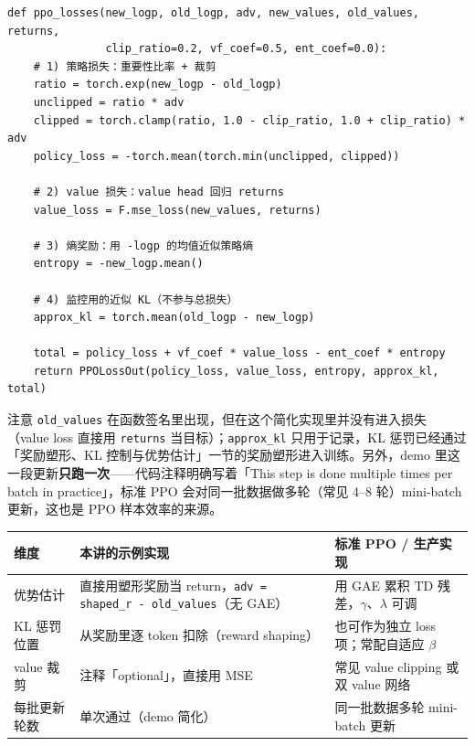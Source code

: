 \begin{lstlisting}[caption={PPO 损失函数的核心实现（据 \texttt{ppo\_loss.py} 课堂代码整理）},label={lst:p8-loss}]
def ppo_losses(new_logp, old_logp, adv, new_values, old_values, returns,
               clip_ratio=0.2, vf_coef=0.5, ent_coef=0.0):
    # 1) 策略损失：重要性比率 + 裁剪
    ratio = torch.exp(new_logp - old_logp)
    unclipped = ratio * adv
    clipped = torch.clamp(ratio, 1.0 - clip_ratio, 1.0 + clip_ratio) * adv
    policy_loss = -torch.mean(torch.min(unclipped, clipped))

    # 2) value 损失：value head 回归 returns
    value_loss = F.mse_loss(new_values, returns)

    # 3) 熵奖励：用 -logp 的均值近似策略熵
    entropy = -new_logp.mean()

    # 4) 监控用的近似 KL（不参与总损失）
    approx_kl = torch.mean(old_logp - new_logp)

    total = policy_loss + vf_coef * value_loss - ent_coef * entropy
    return PPOLossOut(policy_loss, value_loss, entropy, approx_kl, total)
\end{lstlisting}

注意 \texttt{old\_values} 在函数签名里出现，但在这个简化实现里并没有进入损失（value loss 直接用 \texttt{returns} 当目标）；\texttt{approx\_kl} 只用于记录，KL 惩罚已经通过「奖励塑形、KL 控制与优势估计」一节的奖励塑形进入训练。另外，demo 里这一段更新\textbf{只跑一次}——代码注释明确写着「This step is done multiple times per batch in practice」，标准 PPO 会对同一批数据做多轮（常见 4--8 轮）mini-batch 更新，这也是 PPO 样本效率的来源。

\begin{center}
\begin{tabular}{p{3.2cm}p{4.9cm}p{4.9cm}}
\toprule
维度 & 本讲的示例实现 & 标准 PPO / 生产实现 \\
\midrule
优势估计 & 直接用塑形奖励当 return，\texttt{adv = shaped\_r - old\_values}（无 GAE） & 用 GAE 累积 TD 残差，$\gamma$、$\lambda$ 可调 \\
KL 惩罚位置 & 从奖励里逐 token 扣除（reward shaping） & 也可作为独立 loss 项；常配自适应 $\beta$ \\
value 裁剪 & 注释「optional」，直接用 MSE & 常见 value clipping 或双 value 网络 \\
每批更新轮数 & 单次通过（demo 简化） & 同一批数据多轮 mini-batch 更新 \\
\bottomrule
\end{tabular}
\end{center}

